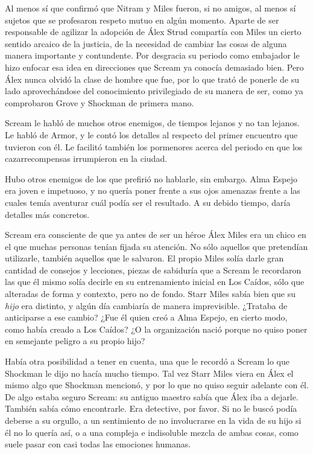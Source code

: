 Al menos sí que confirmó que Nitram y Miles fueron, si no amigos, al menos sí sujetos que se profesaron respeto mutuo en algún momento. Aparte de ser responsable de agilizar la adopción de Álex Strud compartía con Miles un cierto sentido arcaico de la justicia, de la necesidad de cambiar las cosas de alguna manera importante y contundente. Por desgracia su periodo como embajador le hizo enfocar esa idea en direcciones que Scream ya conocía demasiado bien. Pero Álex nunca olvidó la clase de hombre que fue, por lo que trató de ponerle de su lado aprovechándose del conocimiento privilegiado de su manera de ser, como ya comprobaron Grove y Shockman de primera mano.

Scream le habló de muchos otros enemigos, de tiempos lejanos y no tan lejanos. Le habló de Armor, y le contó los detalles al respecto del primer encuentro que tuvieron con él. Le facilitó también los pormenores acerca del periodo en que los cazarrecompensas irrumpieron en la ciudad.

Hubo otros enemigos de los que prefirió no hablarle, sin embargo. Alma Espejo era joven e impetuoso, y no quería poner frente a sus ojos amenazas frente a las cuales temía aventurar cuál podía ser el resultado. A su debido tiempo, daría detalles más concretos.

Scream era consciente de que ya antes de ser un héroe Álex Miles era un chico en el que muchas personas tenían fijada su atención. No sólo aquellos que pretendían utilizarle, también aquellos que le salvaron. El propio Miles solía darle gran cantidad de consejos y lecciones, piezas de sabiduría que a Scream le recordaron las que él mismo solía decirle en su entrenamiento inicial en Los Caídos, sólo que alteradas de forma y contexto, pero no de fondo. Starr Miles sabía bien que su \emph{hijo} era distinto, y algún día cambiaría de manera imprevisible. ¿Trataba de anticiparse a ese cambio? ¿Fue él quien creó a Alma Espejo, en cierto modo, como había creado a Los Caídos? ¿O la organización nació porque no quiso poner en semejante peligro a su propio hijo?

Había otra posibilidad a tener en cuenta, una que le recordó a Scream lo que Shockman le dijo no hacía mucho tiempo. Tal vez Starr Miles viera en Álex el mismo algo que Shockman mencionó, y por lo que no quiso seguir adelante con él. De algo estaba seguro Scream: su antiguo maestro sabía que Álex iba a dejarle. También sabía cómo encontrarle. Era detective, por favor. Si no le buscó podía deberse a su orgullo, a un sentimiento de no involucrarse en la vida de su hijo si él no lo quería así, o a una compleja e indisoluble mezcla de ambas cosas, como suele pasar con casi todas las emociones humanas.

